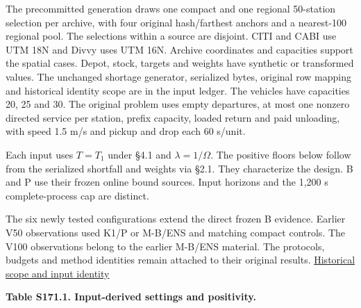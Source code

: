 \documentclass[
  american,
  11pt,
]{article}
\begin{document}
The precommitted generation draws one compact and one regional
50-station selection per archive, with four original hash/farthest
anchors and a nearest-100 regional pool. The selections within a source
are disjoint. CITI and CABI use UTM 18N and Divvy uses UTM 16N. Archive
coordinates and capacities support the spatial cases. Depot, stock,
targets and weights have synthetic or transformed values. The unchanged
shortage generator, serialized bytes, original row mapping and
historical identity scope are in the input ledger. The vehicles have
capacities 20, 25 and 30. The original problem uses empty departures, at
most one nonzero directed service per station, prefix capacity, loaded
return and paid unloading, with speed 1.5 m/s and pickup and drop each
60 s/unit.

Each input uses \(T=T_1\) under §4.1 and \(\lambda=1/\Omega\). The
positive floors below follow from the serialized shortfall and weights
via §2.1. They characterize the design. B and P use their frozen online
bound sources. Input horizons and the 1,200 s complete-process cap are
distinct.

The six newly tested configurations extend the direct frozen B evidence.
Earlier V50 observations used K1/P or M-B/ENS and matching compact
controls. The V100 observations belong to the earlier M-B/ENS material.
The protocols, budgets and method identities remain attached to their
original results.
\href{https://github.com/yifanXovo/TailoredExact/blob/codex/round172-journal-manuscript/results/unified_exact_round171/research_design.md}{Historical
scope and input identity}



\textbf{Table S171.1. Input-derived settings and positivity.}
\end{document}
